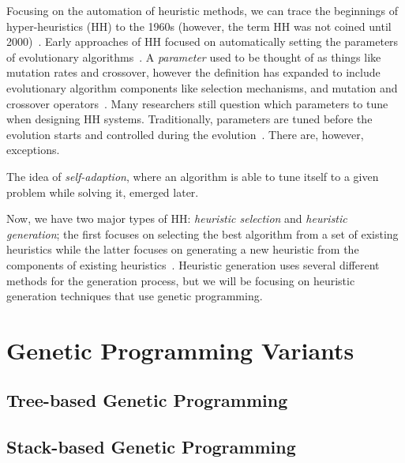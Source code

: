 \documentclass{sig-alternate}
\begin{document}
Focusing on the automation of heuristic methods, we can trace the beginnings of hyper-heuristics (HH) to the 1960s (however, the term HH was not coined until 2000)~\cite{pappa:2014}. Early approaches of HH focused on automatically setting the parameters of evolutionary algorithms~\cite{pappa:2014}. A \textit{parameter} used to be thought of as things like mutation rates and crossover, however the definition has expanded to include evolutionary algorithm components like selection mechanisms, and mutation and crossover operators~\cite{pappa:2014}. Many researchers still question which parameters to tune when designing HH systems. Traditionally, parameters are tuned before the evolution starts and controlled during the evolution~\cite{pappa:2014}. There are, however, exceptions.

The idea of \textit{self-adaption}, where an algorithm is able to tune itself to a given problem while solving it, emerged later.

Now, we have two major types of HH: \textit{heuristic selection} and \textit{heuristic generation}; the first focuses on selecting the best algorithm from a set of existing heuristics while the latter focuses on generating a new heuristic from the components of existing heuristics~\cite{pappa:2014}. Heuristic generation uses several different methods for the generation process, but we will be focusing on heuristic generation techniques that use genetic programming.

\section{Genetic Programming Variants}
\label{sec:gpvariants}

\subsection{Tree-based Genetic Programming}
\label{sec:tgp}

\subsection{Stack-based Genetic Programming}
\label{sec:sgp}
\end{document}
